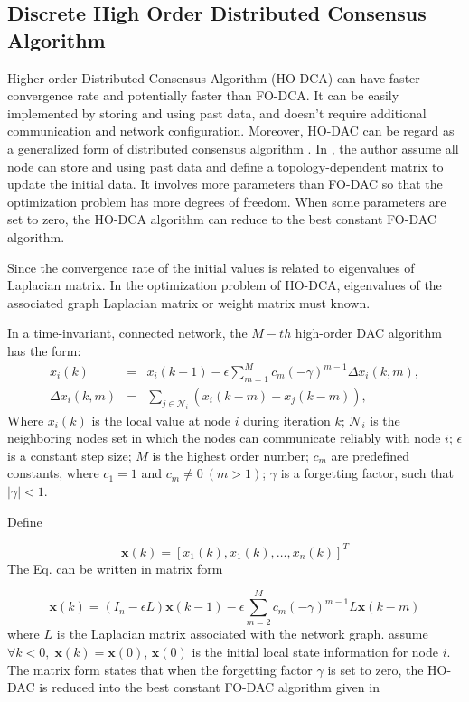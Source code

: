 \subsection{\label{sub:Discrete-High-Order}Discrete High Order Distributed Consensus
Algorithm }

Higher order Distributed Consensus Algorithm (HO-DCA) can have faster
convergence rate and potentially faster than FO-DCA. It can be easily
implemented by storing and using past data, and doesn't require additional
communication and network configuration. Moreover, HO-DAC can be regard
as a generalized form of distributed consensus algorithm \cite{Xiong2010}.
In \cite{Xiong2010}, the author assume all node can store and using
past data and define a topology-dependent matrix to update the initial
data. It involves more parameters than FO-DAC so that the optimization
problem has more degrees of freedom. When some parameters are set
to zero, the HO-DCA algorithm can reduce to the best constant FO-DAC
algorithm.

Since the convergence rate of the initial values is related to eigenvalues
of Laplacian matrix. In the optimization problem of HO-DCA, eigenvalues
of the associated graph Laplacian matrix or weight matrix must known. 

In a time-invariant, connected network, the $M-th$ high-order DAC
algorithm has the form:
\begin{eqnarray}
x_{i}(k) & = & x_{i}(k-1)-\epsilon\sum_{m=1}^{M}c_{m}(-\gamma)^{m-1}\Delta x_{i}(k,m),\label{eq:Iteration Second order x_i(k)}\\
\Delta x_{i}(k,m) & = & \sum_{j\in\mathcal{N}_{i}}\left(x_{i}\left(k-m\right)-x_{j}\left(k-m\right)\right),
\end{eqnarray}
Where $x_{i}(k)$ is the local value at node $i$ during iteration
$k$; $\mathcal{N}_{i}$ is the neighboring nodes set in which the
nodes can communicate reliably with node $i$; $\epsilon$ is a constant
step size; $M$ is the highest order number; $c_{m}$ are predefined
constants, where $c_{1}=1$ and $c_{m}\neq0\:(m>1)$; $\gamma$ is
a forgetting factor, such that $\left|\gamma\right|<1$. 

Define

\begin{equation}
\mathbf{x}(k)=\left[x_{1}(k),x_{1}(k),\ldots,x_{n}(k)\right]^{T}
\end{equation}
The Eq. can be written in matrix
form

\begin{equation}
\mathbf{x}(k)=(I_{n}-\epsilon L)\mathbf{x}(k-1)-\epsilon\sum_{m=2}^{M}c_{m}(-\gamma)^{m-1}L\mathbf{x}(k-m)\label{eq:High Order Iter.Vec}
\end{equation}
where $L$ is the Laplacian matrix associated with the network graph.
assume $\forall k<0,\;\mathbf{x}(k)=\mathbf{x}(0)$, $\mathbf{x}(0)$
is the initial local state information for node $i$. The matrix form
states that when the forgetting factor $\gamma$ is set to zero, the
HO-DAC is reduced into the best constant FO-DAC algorithm given in 

